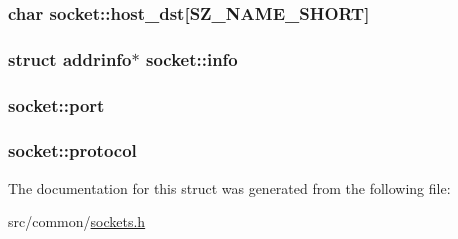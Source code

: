 \subsubsection[{\texorpdfstring{host\+\_\+dst}{host_dst}}]{\setlength{\rightskip}{0pt plus 5cm}char socket\+::host\+\_\+dst\mbox{[}{\bf S\+Z\+\_\+\+N\+A\+M\+E\+\_\+\+S\+H\+O\+RT}\mbox{]}}\hypertarget{structsocket_a960383b98e100a269c3c88c0dcf02745}{}\label{structsocket_a960383b98e100a269c3c88c0dcf02745}
\subsubsection[{\texorpdfstring{info}{info}}]{\setlength{\rightskip}{0pt plus 5cm}struct addrinfo$\ast$ socket\+::info}\hypertarget{structsocket_a85b401d22d0c7860590b4ff073fc2348}{}\label{structsocket_a85b401d22d0c7860590b4ff073fc2348}
\subsubsection[{\texorpdfstring{port}{port}}]{ socket\+::port}\hypertarget{structsocket_a34bc687da597ff0961d2cac70270347a}{}\label{structsocket_a34bc687da597ff0961d2cac70270347a}
\subsubsection[{\texorpdfstring{protocol}{protocol}}]{ socket\+::protocol}\hypertarget{structsocket_a81a5c1e41565a6b97b741c8de80a9c4b}{}\label{structsocket_a81a5c1e41565a6b97b741c8de80a9c4b}


The documentation for this struct was generated from the following file\+:\begin{DoxyCompactItemize}
\item 
src/common/\hyperlink{sockets_8h}{sockets.\+h}\end{DoxyCompactItemize}
